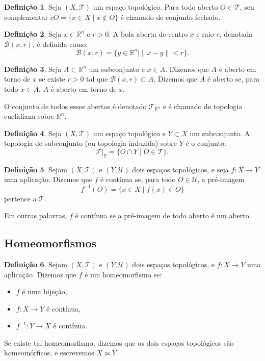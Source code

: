 \documentclass[12pt, a4paper]{article}
\theoremstyle{plain}
\theoremstyle{definition}
\newtheorem{definition}{Definição}[section]
\theoremstyle{remark}
\begin{document}
\begin{definition}
Seja $(X, \mathcal{T})$ um espaço topológico. Para todo aberto $O \in \mathcal{T}$, seu complementar $cO = \{x \in X \mid x \notin O\}$ é chamado de conjunto fechado.
\end{definition}

\begin{definition}
Seja $x \in \mathbb{R}^n$ e $r > 0$. A bola aberta de centro $x$ e raio $r$, denotada $\mathcal{B}(x, r)$, é definida como:
\[
\mathcal{B}(x, r) = \{y \in \mathbb{R}^n \mid \|x - y\| < r\}.
\]
\end{definition}

\begin{definition}
Seja $A \subset \mathbb{R}^n$ um subconjunto e $x \in A$. Dizemos que $A$ é aberto em torno de $x$ se existe $r > 0$ tal que $\mathcal{B}(x,r) \subset A$. Dizemos que $A$ é aberto se, para todo $x \in A$, $A$ é aberto em torno de $x$.

O conjunto de todos esses abertos é denotado $\mathcal{T}_{\mathbb{R}^n}$ e é chamado de topologia euclidiana sobre $\mathbb{R}^n$.
\end{definition}

\begin{definition}
Seja $(X, \mathcal{T})$ um espaço topológico e $Y \subset X$ um subconjunto. A topologia de subconjunto (ou topologia induzida) sobre $Y$ é o conjunto:
\[
\mathcal{T}|_Y = \{O \cap Y \mid O \in \mathcal{T}\}.
\]
\end{definition}

\begin{definition}
Sejam $(X, \mathcal{T})$ e $(Y, \mathcal{U})$ dois espaços topológicos, e seja $f: X \to Y$ uma aplicação. Dizemos que $f$ é contínua se, para todo $O \in \mathcal{U}$, a pré-imagem
\[
f^{-1}(O) = \{x \in X \mid f(x) \in O\}
\]
pertence a $\mathcal{T}$.

Em outras palavras, $f$ é contínua se a pré-imagem de todo aberto é um aberto.
\end{definition}

\subsection{Homeomorfismos}

\begin{definition}
Sejam $(X, \mathcal{T})$ e $(Y, \mathcal{U})$ dois espaços topológicos, e $f: X \to Y$ uma aplicação. Dizemos que $f$ é um homeomorfismo se:
\begin{itemize}
    \item $f$ é uma bijeção,
    \item $f: X \to Y$ é contínua,
    \item $f^{-1}: Y \to X$ é contínua.
\end{itemize}
Se existe tal homeomorfismo, dizemos que os dois espaços topológicos são homeomórficos, e escrevemos $X \simeq Y$.
\end{definition}
\end{document}
